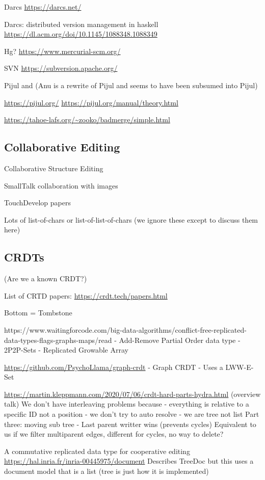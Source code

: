 Darcs \url{https://darcs.net/}

  Darcs: distributed version management in haskell \url{https://dl.acm.org/doi/10.1145/1088348.1088349}

Hg? \url{https://www.mercurial-scm.org/}

SVN \url{https://subversion.apache.org/}

Pijul and (Anu is a rewrite of Pijul and seems to have been subsumed into Pijul)

  \url{https://pijul.org/}
  \url{https://pijul.org/manual/theory.html}

  \url{https://tahoe-lafs.org/~zooko/badmerge/simple.html}

\subsection{Collaborative Editing}

Collaborative Structure Editing

SmallTalk collaboration with images

TouchDevelop papers

Lots of list-of-chars or list-of-list-of-chars (we ignore these except to discuss them here)

\subsection{CRDTs}
(Are we a known CRDT?)

List of CRTD papers: \url{https://crdt.tech/papers.html}

Bottom = Tombstone

https://www.waitingforcode.com/big-data-algorithms/conflict-free-replicated-data-types-flags-graphs-maps/read
 - Add-Remove Partial Order data type
 - 2P2P-Sets
 - Replicated Growable Array

\url{https://github.com/PsychoLlama/graph-crdt}
 - Graph CRDT
 - Uses a LWW-E-Set

\url{https://martin.kleppmann.com/2020/07/06/crdt-hard-parts-hydra.html} (overview talk)
 We don't have interleaving problems because
   - everything is relative to a specific ID not a position
   - we don't try to auto resolve
   - we are tree not list
   Part three: moving sub tree
   - Last parent writter wins (prevents cycles)
     Equivalent to us if we filter multiparent edges, different for cycles, no way to delete?

A commutative replicated data type for cooperative editing
  \url{https://hal.inria.fr/inria-00445975/document}
  Describes TreeDoc but this uses a document model that is a list (tree is just how it is implemented)

